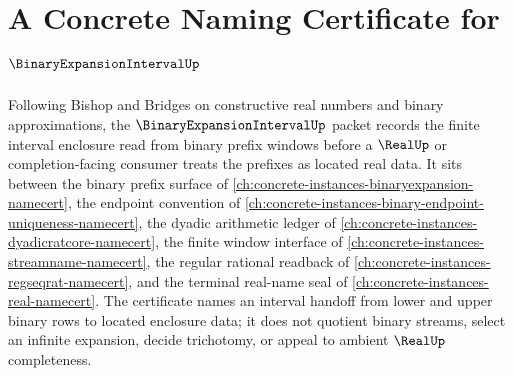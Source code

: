 \chapter{A Concrete Naming Certificate for $\BinaryExpansionIntervalUp$}
\label{ch:concrete-instances-binary-expansion-interval-namecert}

Following Bishop and Bridges on constructive real numbers and binary approximations, the $\BinaryExpansionIntervalUp$ packet records the finite interval enclosure read from binary prefix windows before a $\RealUp$ or completion-facing consumer treats the prefixes as located real data. It sits between the binary prefix surface of \autoref{ch:concrete-instances-binaryexpansion-namecert}, the endpoint convention of \autoref{ch:concrete-instances-binary-endpoint-uniqueness-namecert}, the dyadic arithmetic ledger of \autoref{ch:concrete-instances-dyadicratcore-namecert}, the finite window interface of \autoref{ch:concrete-instances-streamname-namecert}, the regular rational readback of \autoref{ch:concrete-instances-regseqrat-namecert}, and the terminal real-name seal of \autoref{ch:concrete-instances-real-namecert}. The certificate names an interval handoff from lower and upper binary rows to located enclosure data; it does not quotient binary streams, select an infinite expansion, decide trichotomy, or appeal to ambient $\RealUp$ completeness.

